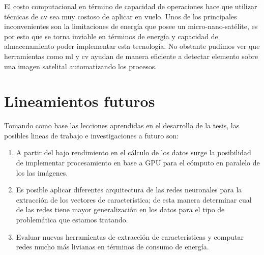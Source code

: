 El costo computacional en término de capacidad de operaciones hace que utilizar técnicas de \ac{cv} sea  muy costoso de aplicar en vuelo. Unos de los principales inconvenientes son la limitaciones de energía que posee un micro-nano-satélite, es por esto que se torna inviable en términos de energía y capacidad de almacenamiento poder implementar esta tecnología. No obstante pudimos ver que herramientas como \ac{ml} y \ac{cv} ayudan de manera eficiente a detectar elemento sobre una imagen satelital automatizando los procesos.



\section{Lineamientos futuros}\label{lineafuturas}
Tomando como base las lecciones aprendidas en el desarrollo de la tesis, las posibles lineas de trabajo e investigaciones a futuro son:
\begin{enumerate}
 \item A partir del bajo rendimiento en el cálculo de los datos surge la posibilidad de implementar procesamiento en base a GPU para el cómputo en paralelo de los las imágenes.
 \item Es posible aplicar diferentes arquitectura de las redes neuronales para la extracción de los vectores de característica; de esta manera determinar cual de las redes tiene mayor generalización en los datos para el tipo de problemática que estamos tratando.
 \item Evaluar nuevas herramientas de extracción de características y computar redes mucho más livianas en términos de consumo de energía.
\end{enumerate}